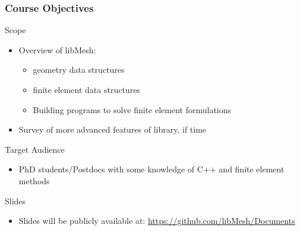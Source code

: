 \begin{frame}
\frametitle{Course Objectives}

\begin{block}{Scope}
\begin{itemize}
\item Overview of libMesh:
        \begin{itemize}
        \item geometry data structures
        \item finite element data structures
        \item Building programs to solve finite element formulations
        \end{itemize}
\item Survey of more advanced features of library, if time
\end{itemize}
\end{block}

\begin{block}{Target Audience}
\begin{itemize}
\item PhD students/Postdocs with some knowledge of C++ and finite
  element methods
\end{itemize}
\end{block}

\begin{block}{Slides}
\begin{itemize}
\item Slides will be publicly available at: \url{https://github.com/libMesh/Documents}
\end{itemize}
\end{block}

\end{frame}

